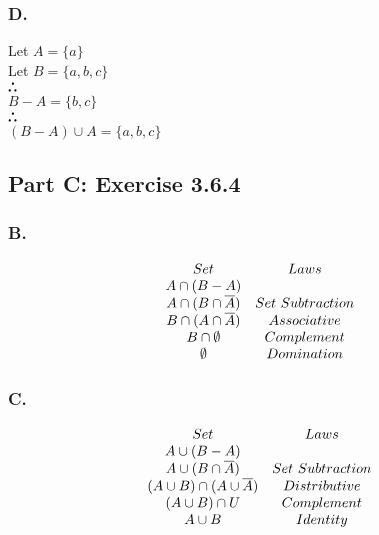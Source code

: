 \documentclass[titlepage]{article}\pagestyle{empty}
\def\therefore{\boldsymbol{\text{ }
\leavevmode
\lower0.4ex\hbox{$\cdot$}
\kern-.5em\raise0.7ex\hbox{$\cdot$}
\kern-0.55em\lower0.4ex\hbox{$\cdot$}
\thinspace\text{ }}}
\begin{document}
\subsubsection*{D.}	
\begin{center}
Let $A = \{a\}$\\
Let $B = \{a, b, c\}$\\
$\therefore$\\ $B - A = \{b, c\}$\\
$\therefore$\\ $(B - A) \cup A = \{a,b,c\}$ 
\end{center}
\subsection*{Part C: Exercise 3.6.4} 
\subsubsection*{B.} 
\begin{displaymath}
\begin{array}{c c}
Set & Laws\\
A \cap (B - A) & \\
A \cap (B \cap \overline{A}) & Set\ Subtraction \\
B \cap (A \cap \overline{A}) & Associative \\
B \cap \emptyset & Complement \\
\emptyset & Domination
\end{array}
\end{displaymath}
\subsubsection*{C.}
\begin{displaymath}
\begin{array}{c c}
Set & Laws\\
A \cup (B - A) & \\
A \cup (B \cap \overline{A}) & Set\ Subtraction \\
(A \cup B) \cap (A \cup \overline{A}) & Distributive\\
(A \cup B) \cap U & Complement\\
A \cup B & Identity
\end{array}
\end{displaymath}
\end{document}
